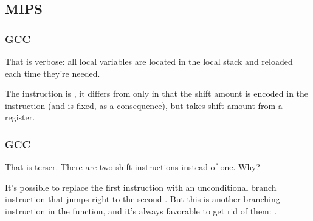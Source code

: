 \subsection{MIPS}

\subsubsection{\NonOptimizing GCC}




That is verbose: all local variables are located in the local stack and reloaded each time they're needed.

The \SLLV instruction is , it differs from \SLL only in that
the shift amount is encoded in the \SLL instruction (and is fixed, as a consequence), 
but \SLLV takes shift amount from a register.

\subsubsection{\Optimizing GCC}

That is terser.
There are two shift instructions instead of one.
Why?

It's possible to replace the first \SLLV instruction with an unconditional branch instruction that jumps right to the second \SLLV.
But this is another branching instruction in the function, and it's always favorable to get rid of them: .




